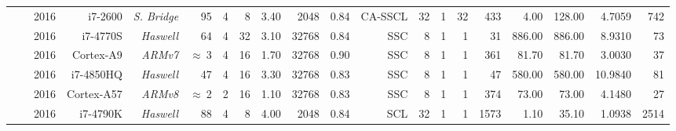 \begin{table}[htp]
{{\begin{tabular}{|r|r r|r r r r r r|r r|r r r r|r r|r r r|}
                                                                 & \cite{Sarkis2016}    & 2016          & i7-2600            & \textit{S. Bridge} &          95  & {\color{Paired-1}4} &   8           & 3.40           &  2048    & 0.84     &   CA-SSCL          & 32            &                     1  & 32                &                     433  &                     4.00  &  128.00       &  4.7059        &    742             \\
                                                                 & \cite{Giard2016b}    & 2016          & i7-4770S           & \textit{Haswell}   &          64  & {\color{Paired-1}4} &  32           & 3.10           & 32768    & 0.84     &      SSC           &  8            &                     1  &  1                &                      31  &                   886.00  &  886.00       &  8.9310        &     73             \\
                                                                 & \cite{Giard2016b}    & 2016          & Cortex-A9          & \textit{ARMv7}     & $\approx~$3  & {\color{Paired-1}4} &  16           & 1.70           & 32768    & 0.90     &      SSC           &  8            &                     1  &  1                &                     361  &                    81.70  &   81.70       &  3.0030        &     37             \\
                                                                 & \cite{Cassagne2016b} & 2016          & i7-4850HQ          & \textit{Haswell}   &          47  & {\color{Paired-1}4} &  16           & 3.30           & 32768    & 0.83     &      SSC           &  8            &                     1  &  1                &                      47  &                   580.00  &  580.00       & 10.9840        &     81             \\
                                                                 & \cite{Cassagne2016b} & 2016          & Cortex-A57         & \textit{ARMv8}     & $\approx~$2  & {\color{Paired-1}2} &  16           & 1.10           & 32768    & 0.83     &      SSC           &  8            &                     1  &  1                &                     374  &                    73.00  &   73.00       &  4.1480        &     27             \\
                                                                 & \cite{Shen2016}      & 2016          & i7-4790K           & \textit{Haswell}   &          88  & {\color{Paired-1}4} &   8           & 4.00           &  2048    & 0.84     &       SCL          & 32            &                     1  &  1                &                    1573  &                     1.10  &   35.10       &  1.0938        &   2514             \\

\end{tabular}}}
\end{table}
